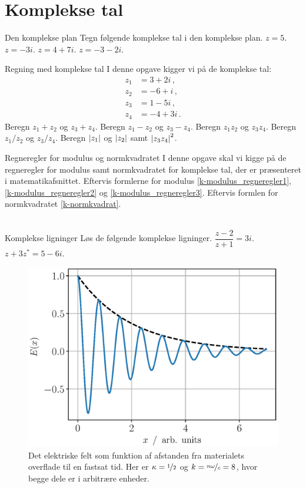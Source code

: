 \section*{Komplekse tal}
\begin{opgave}[1]{Den komplekse plan}
Tegn følgende komplekse tal i den komplekse plan.
\opg $z = 5$.
\opg $z = -3i$.
\opg $z = 4 + 7i$.
\opg $z = -3 - 2i$.
\end{opgave}
\begin{opgave}[1]{Regning med komplekse tal}
I denne opgave kigger vi på de komplekse tal:
\begin{align*}
z_1 &= 3 + 2i \, , \\
z_2 &= -6+i \, , \\ 
z_3 &= 1 - 5i \, , \\
z_4 &= -4 + 3i \, .
\end{align*}
\opg Beregn $z_1+z_2$ og $z_3+z_4$.
\opg Beregn $z_1-z_2$ og $z_3-z_4$.
\opg Beregn $z_1z_2$ og $z_3z_4$.
\opg Beregn $z_1/z_2$ og $z_3/z_4$.
\opg Beregn $\abs{z_1}$ og $\abs{z_2}$ samt $\abs{z_3 z_4}^2$. 
\end{opgave}
\begin{opgave}[2]{Regneregler for modulus og normkvadratet}
I denne opgave skal vi kigge på de regneregler for modulus samt normkvadratet for komplekse tal, der er  præsenteret i matematikafsnittet.
\opg Eftervis formlerne for modulus \eqref{k-modulus_regneregler1}, \eqref{k-modulus_regneregler2} og \eqref{k-modulus_regneregler3}.
\opg Eftervis formlen for normkvadratet \eqref{k-normkvadrat}.\\ \\  
\end{opgave}
\begin{opgave}[2]{Komplekse ligninger}
Løs de følgende komplekse ligninger.
\opg $\dfrac{z-2}{z+1} = 3i$.
\opg $z+3z^* = 5-6i$.
\end{opgave}
\begin{figure}
    \centering
    \includegraphics[width=.6\columnwidth]{Matematik/matfig/e-felt.eps}
    \caption{Det elektriske felt som funktion af afstanden fra materialets overflade til en fastsat tid. Her er $\kappa = \nicefrac{1}{2}$ og $k=\nicefrac{n\omega}{c}=8$, hvor begge dele er i arbitrære enheder.}
    \label{mat:fig:e-felt}
\end{figure}
